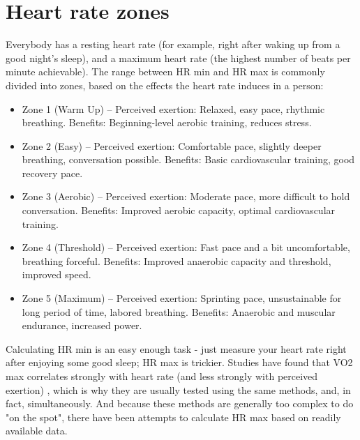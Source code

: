\section{Heart rate zones}

Everybody has a resting heart rate (for example, right after waking up from a good night's sleep), and a maximum heart rate (the highest number of beats per minute achievable).
The range between HR min and HR max is commonly divided into zones, based on the effects the heart rate induces in a person:
\begin{itemize}
    \item Zone 1 (Warm Up) --
    Perceived exertion: Relaxed, easy pace, rhythmic breathing.
    Benefits: Beginning-level aerobic training, reduces stress.
    \item Zone 2 (Easy) --
    Perceived exertion: Comfortable pace, slightly deeper breathing, conversation possible.
    Benefits: Basic cardiovascular training, good recovery pace.
    \item Zone 3 (Aerobic) --
    Perceived exertion: Moderate pace, more difficult to hold conversation.
    Benefits: Improved aerobic capacity, optimal cardiovascular training.
    \item Zone 4 (Threshold) --
    Perceived exertion: Fast pace and a bit uncomfortable, breathing forceful.
    Benefits: Improved anaerobic capacity and threshold, improved speed.
    \item Zone 5 (Maximum) --
    Perceived exertion: Sprinting pace, unsustainable for long period of time, labored breathing.
    Benefits: Anaerobic and muscular endurance, increased power.\cite{garmin-heart-zones}
\end{itemize}


Calculating HR min is an easy enough task - just measure your heart rate right after enjoying some good sleep; HR max is trickier.
Studies have found that VO2 max correlates strongly with heart rate (and less strongly with perceived exertion) \cite{vo2-max-hr-correlation}, which is why they are usually tested using the same methods, and, in fact, simultaneously.
And because these methods are generally too complex to do "on the spot", there have been attempts to calculate HR max based on readily available data.

